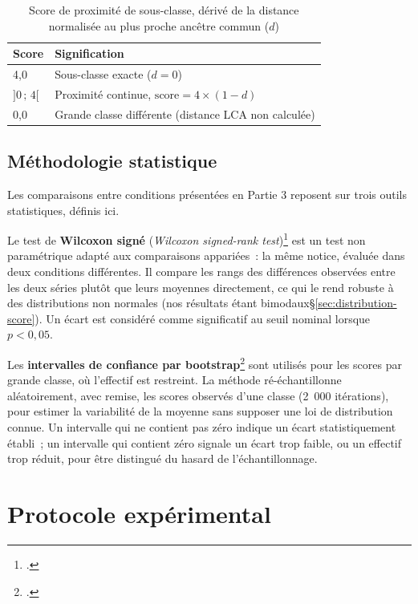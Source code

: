 \begin{table}[h]
\centering
\begin{tabular}{ll}
\toprule
\textbf{Score} & \textbf{Signification} \\
\midrule
4,0 & Sous-classe exacte ($d = 0$) \\
$]0\,;\,4[$ & Proximité continue, $\text{score} = 4 \times (1 - d)$ \\
0,0 & Grande classe différente (distance LCA non calculée) \\
\bottomrule
\end{tabular}
\caption{Score de proximité de sous-classe, dérivé de la distance normalisée au plus proche ancêtre commun ($d$)}
\label{tab:score-lca}
\end{table}

\subsection{Méthodologie statistique}
\label{sec:methodologie-stats}

Les comparaisons entre conditions présentées en Partie 3 reposent sur trois outils statistiques, définis ici.

Le test de \textbf{Wilcoxon signé} (\textit{Wilcoxon signed-rank test})\footcite{wilcoxon1945} est un test non paramétrique adapté aux comparaisons appariées~: la même notice, évaluée dans deux conditions différentes. Il compare les rangs des différences observées entre les deux séries plutôt que leurs moyennes directement, ce qui le rend robuste à des distributions non normales (nos résultats étant bimodaux\S\ref{sec:distribution-score}). Un écart est considéré comme significatif au seuil nominal lorsque $p < 0{,}05$.

Les \textbf{intervalles de confiance par bootstrap}\footcite{efron1979} sont utilisés pour les scores par grande classe, où l'effectif est restreint. La méthode ré-échantillonne aléatoirement, avec remise, les scores observés d'une classe (2~000 itérations), pour estimer la variabilité de la moyenne sans supposer une loi de distribution connue. Un intervalle qui ne contient pas zéro indique un écart statistiquement établi~; un intervalle qui contient zéro signale un écart trop faible, ou un effectif trop réduit, pour être distingué du hasard de l'échantillonnage.


\section{Protocole expérimental}

